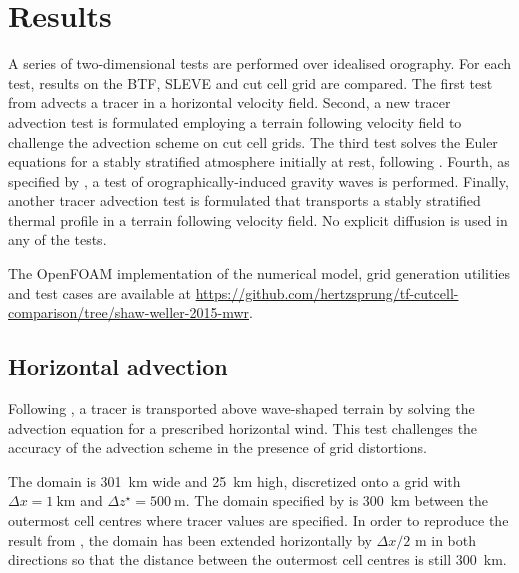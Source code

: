 \documentclass{ametsoc}
\begin{document}


\section{Results}
\label{sec:results}

A series of two-dimensional tests are performed over idealised orography.  For each test, results on the BTF, SLEVE and cut cell grid are compared.  The first test from \citet{schaer2002} advects a tracer in a horizontal velocity field.  Second, a new tracer advection test is formulated employing a terrain following velocity field to challenge the advection scheme on cut cell grids.  The third test solves the Euler equations for a stably stratified atmosphere initially at rest, following \citet{klemp2011}.  Fourth, as specified by \citet{schaer2002}, a test of orographically-induced gravity waves is performed.  Finally, another tracer advection test is formulated that transports a stably stratified thermal profile in a terrain following velocity field.
No explicit diffusion is used in any of the tests.

The OpenFOAM implementation of the numerical model, grid generation utilities and test cases are available at \url{https://github.com/hertzsprung/tf-cutcell-comparison/tree/shaw-weller-2015-mwr}.


\subsection{Horizontal advection}

Following \citet{schaer2002}, a tracer is transported above wave-shaped terrain by solving the advection equation for a prescribed horizontal wind.  This test challenges the accuracy of the advection scheme in the presence of grid distortions.

The domain is \SI{301}{\kilo\meter} wide and \SI{25}{\kilo\meter} high, discretized onto a grid with \(\Delta x = \SI{1}{\kilo\meter}\) and \(\Delta z^\star = \SI{500}{\meter}\).  The domain specified by \citet{schaer2002} is \SI{300}{\kilo\meter} between the outermost cell centres where tracer values are specified.  In order to reproduce the result from \citet{schaer2002}, the domain has been extended horizontally by \(\Delta x/2\) \si{\meter} in both directions so that the distance between the outermost cell centres is still \SI{300}{\kilo\meter}.
\end{document}
